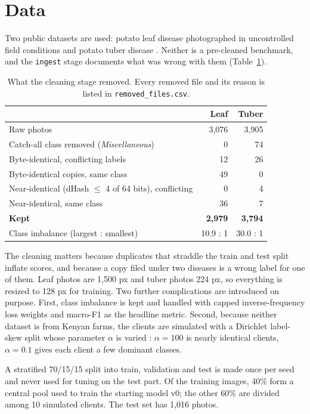 \documentclass[11pt,a4paper]{article}
\begin{document}
\section{Data}
Two public datasets are used: potato leaf disease photographed in uncontrolled field conditions \citep{shabrina2023potato} and potato tuber disease \citep{islam2025potatocare}. Neither is a pre-cleaned benchmark, and the \texttt{ingest} stage documents what was wrong with them (Table~\ref{tab:clean}).

\begin{table}[H]\centering\small
\begin{tabular}{lrr}\toprule & Leaf & Tuber \\\midrule
Raw photos & 3,076 & 3,905 \\
Catch-all class removed (\emph{Miscellaneous}) & 0 & 74 \\
Byte-identical, conflicting labels & 12 & 26 \\
Byte-identical copies, same class & 49 & 0 \\
Near-identical (dHash $\le$ 4 of 64 bits), conflicting & 0 & 4 \\
Near-identical, same class & 36 & 7 \\\midrule
\textbf{Kept} & \textbf{2,979} & \textbf{3,794} \\
Class imbalance (largest : smallest) & 10.9 : 1 & 30.0 : 1 \\\bottomrule
\end{tabular}
\caption{What the cleaning stage removed. Every removed file and its reason is listed in \texttt{removed\_files.csv}.}\label{tab:clean}
\end{table}

The cleaning matters because duplicates that straddle the train and test split inflate scores, and because a copy filed under two diseases is a wrong label for one of them. Leaf photos are 1,500 px and tuber photos 224 px, so everything is resized to 128 px for training. Two further complications are introduced on purpose. First, class imbalance is kept and handled with capped inverse-frequency loss weights and macro-F1 as the headline metric. Second, because neither dataset is from Kenyan farms, the clients are simulated with a Dirichlet label-skew split whose parameter $\alpha$ is varied \citep{hsu2019measuring}: $\alpha=100$ is nearly identical clients, $\alpha=0.1$ gives each client a few dominant classes.

A stratified 70/15/15 split into train, validation and test is made once per seed and never used for tuning on the test part. Of the training images, 40\% form a central pool used to train the starting model v0; the other 60\% are divided among 10 simulated clients. The test set has 1,016 photos.
\end{document}
